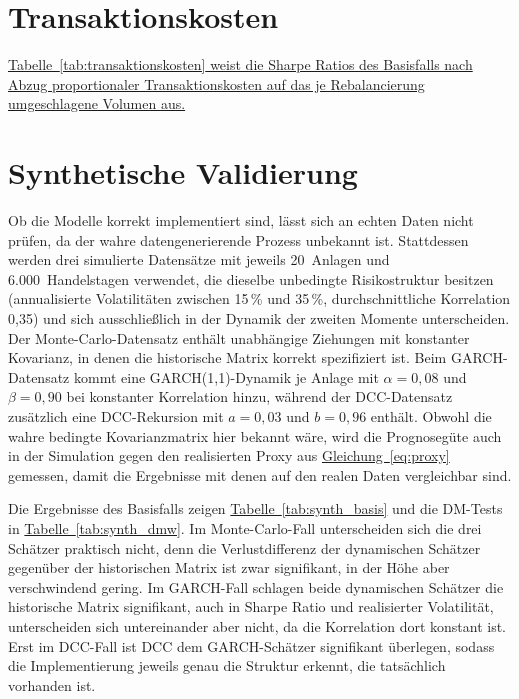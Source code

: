 \documentclass[12pt,a4paper]{article}
\begin{document}
\section{Transaktionskosten}\label{sec:anhang_kosten}
\hyperref[tab:transaktionskosten]{Tabelle~\ref*{tab:transaktionskosten} weist die Sharpe Ratios des Basisfalls nach Abzug proportionaler Transaktionskosten auf das je Rebalancierung umgeschlagene Volumen aus.}



\section{Synthetische Validierung}\label{sec:anhang_synth}
Ob die Modelle korrekt implementiert sind, lässt sich an echten Daten nicht prüfen, da der wahre datengenerierende Prozess unbekannt ist.
Stattdessen werden drei simulierte Datensätze mit jeweils 20~Anlagen und 6.000~Handelstagen verwendet, die dieselbe unbedingte Risikostruktur besitzen (annualisierte Volatilitäten zwischen 15\,\% und 35\,\%, durchschnittliche Korrelation 0,35) und sich ausschließlich in der Dynamik der zweiten Momente unterscheiden.
Der Monte-Carlo-Datensatz enthält unabhängige Ziehungen mit konstanter Kovarianz, in denen die historische Matrix korrekt spezifiziert ist.
Beim GARCH-Datensatz kommt eine GARCH(1,1)-Dynamik je Anlage mit $\alpha = 0{,}08$ und $\beta = 0{,}90$ bei konstanter Korrelation hinzu, während der DCC-Datensatz zusätzlich eine DCC-Rekursion mit $a = 0{,}03$ und $b = 0{,}96$ enthält.
Obwohl die wahre bedingte Kovarianzmatrix hier bekannt wäre, wird die Prognosegüte auch in der Simulation gegen den realisierten Proxy aus \hyperref[eq:proxy]{Gleichung~\ref*{eq:proxy}} gemessen, damit die Ergebnisse mit denen auf den realen Daten vergleichbar sind.

Die Ergebnisse des Basisfalls zeigen \hyperref[tab:synth_basis]{Tabelle~\ref*{tab:synth_basis}} und die DM-Tests in \hyperref[tab:synth_dmw]{Tabelle~\ref*{tab:synth_dmw}}.
Im Monte-Carlo-Fall unterscheiden sich die drei Schätzer praktisch nicht, denn die Verlustdifferenz der dynamischen Schätzer gegenüber der historischen Matrix ist zwar signifikant, in der Höhe aber verschwindend gering.
Im GARCH-Fall schlagen beide dynamischen Schätzer die historische Matrix signifikant, auch in Sharpe Ratio und realisierter Volatilität, unterscheiden sich untereinander aber nicht, da die Korrelation dort konstant ist.
Erst im DCC-Fall ist DCC dem GARCH-Schätzer signifikant überlegen, sodass die Implementierung jeweils genau die Struktur erkennt, die tatsächlich vorhanden ist.
\end{document}
